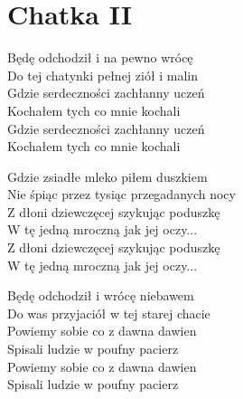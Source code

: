\section{Chatka II}
\begin{text}
Będę odchodził i na pewno wrócę\\
Do tej chatynki pełnej ziół i malin\\
Gdzie serdeczności zachłanny uczeń\\
Kochałem tych co mnie kochali\\
Gdzie serdeczności zachłanny uczeń\\
Kochałem tych co mnie kochali

Gdzie zsiadłe mleko piłem duszkiem\\
Nie śpiąc przez tysiąc przegadanych nocy\\
Z dłoni dziewczęcej szykując poduszkę\\
W tę jedną mroczną jak jej oczy...\\
Z dłoni dziewczęcej szykując poduszkę\\
W tę jedną mroczną jak jej oczy...

Będę odchodził i wrócę niebawem\\
Do was przyjaciół w tej starej chacie\\
Powiemy sobie co z dawna dawien\\
Spisali ludzie w poufny pacierz\\
Powiemy sobie co z dawna dawien\\
Spisali ludzie w poufny pacierz
\end{text}